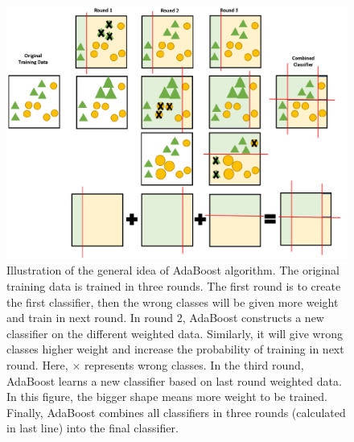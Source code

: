 \begin{centering}
	\begin{figure}
		\centering
		\includegraphics[width=\linewidth]{figures/adaboost.png}
		\caption[Illustration of the AdoBoost Algorithm.]{Illustration of the general idea of AdaBoost algorithm. The original training data is trained in three rounds. The first round is to create the first classifier, then the wrong classes will be given more weight and train in next round. In round 2, AdaBoost constructs a new classifier on the different weighted data. Similarly, it will give wrong classes higher weight and increase the probability of training in next round. Here, $ \times $ represents wrong classes. In the third round, AdaBoost learns a new classifier based on last round weighted data. In this figure, the bigger shape means more weight to be trained. Finally, AdaBoost combines all classifiers in three rounds (calculated in last line) into the final classifier.}
		\label{fig:adaboost}
	\end{figure}
\end{centering}

